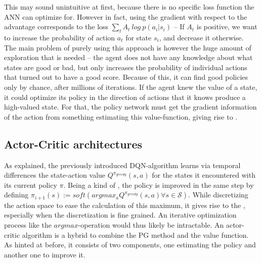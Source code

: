 This may sound unintuitive at first, because there is no specific loss function the ANN can optimize for. However in fact, using the gradient with respect to the advantage corresponds to the loss $\sum_t A_t~log~p(a_i|s_i)$ -- If $A_t$ is positive, we want to increase the probability of action $a_t$ for state $s_i$, and decrease it otherwise.\\

\noindent The main problem of purely using this approach is however the huge amount of exploration that is needed -- the agent does not have any knowledge about what states are good or bad, but only increases the probability of individual actions that turned out to have a good score. Because of this, it can find good policies only by chance, after millions of iterations. If the agent knew the value of a state, it could optimize its policy in the direction of actions that it knows produce a high-valued state. For that, the policy network must get the gradient information of the action from something estimating this value-function, giving rise to .

\subsection{Actor-Critic architectures}

\label{sec:actorcrit}

As explained, the previously introduced DQN-algorithm learns via temporal differences the state-action value $Q^{\pi_{greedy}}(s,a)$ for the states it encountered with its current policy $\pi$. Being a kind of , the policy is improved in the same step by defining $\pi_{i+1}(s) := soft(argmax_a Q^{\pi_{greedy}}(s,a) \forall s \in \mathcal{S})$. While discretizing the action space to ease the calculation of this maximum, it gives rise to the , especially when the discretization is fine grained. An iterative optimization process like the $argmax$-operation would thus likely be intractable. An actor-critic algorithm is a hybrid to combine the PG method and the value function. As hinted at before, it consists of two components, one estimating the policy and another one to improve it.

